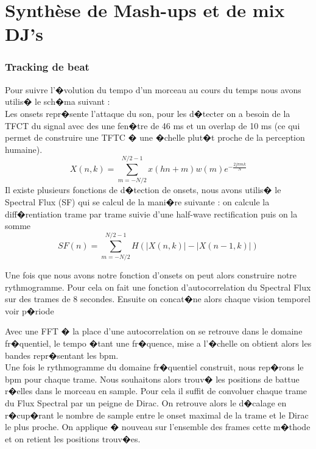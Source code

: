 \documentclass[12pt,a4paper]{article}
\begin{document}
\part{Synthèse de Mash-ups et de mix DJ's}

\section{Tracking de beat}
Pour suivre l'�volution du tempo d'un morceau au cours du temps nous avons utilis� le sch�ma suivant  :\\

Les onsets repr�sente l'attaque du son, pour les d�tecter on a besoin de la TFCT du signal avec des une fen�tre de 46 ms et un overlap de 10 ms (ce qui permet de construire une TFTC � une �chelle plut�t proche de la perception humaine).
\begin{equation*}
X(n,k) = \sum_{m=-N/2}^{N/2-1}x(hn+m)w(m) e^{- \frac{2j\pi m k}{N}}
\end{equation*}
Il existe plusieurs fonctions de d�tection de onsets, nous avons utilis� le Spectral Flux (SF) qui se calcul de la mani�re suivante :
on calcule la diff�rentiation trame par trame suivie d'une half-wave rectification puis on la somme
\begin{equation*}
SF(n) =  \sum_{m=-N/2}^{N/2-1} H(\mid{X(n,k)|}-\mid{X(n-1,k)|})
\end{equation*}

Une fois que nous avons notre fonction d'onsets on peut alors construire notre rythmogramme. Pour cela on fait une fonction d'autocorrelation du Spectral Flux sur des trames de 8 secondes. Ensuite on concat�ne alors chaque vision temporel voir p�riode

Avec une  FFT � la place d'une autocorrelation on se retrouve dans le domaine fr�quentiel, le tempo �tant une fr�quence, mise a l'�chelle on obtient alors les bandes repr�sentant les bpm.\\


Une fois le rythmogramme du domaine fr�quentiel construit, nous rep�rons le bpm pour chaque trame. Nous souhaitons alors trouv� les positions de battue r�elles dans le morceau en sample. Pour cela il suffit de convoluer chaque trame du Flux Spectral par un peigne de Dirac. On retrouve alors le d�calage en r�cup�rant le nombre de sample entre le onset maximal de la trame et le Dirac le plus proche.
On applique � nouveau sur l'ensemble des frames cette m�thode et on retient les positions trouv�es.


\end{document}
